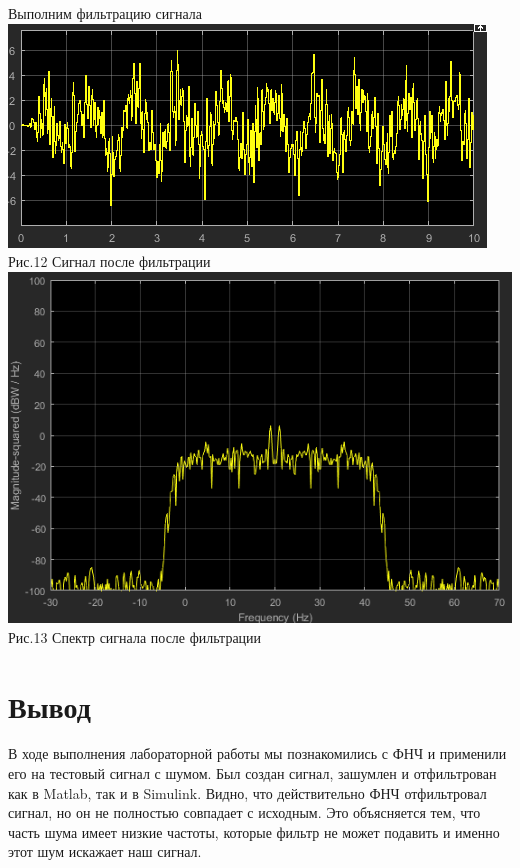 \documentclass[a4paper,12pt]{article}
\begin{document}
Выполним фильтрацию сигнала
\center\includegraphics{pictures/SimulFiltSig.png} \\ Рис.12 Сигнал после фильтрации
\center\includegraphics{pictures/SimulSpecFiltSig.png} \\ Рис.13 Спектр сигнала после фильтрации



\section{Вывод}
В ходе выполнения лабораторной работы мы познакомились с ФНЧ и применили его на тестовый сигнал с шумом. Был создан сигнал, зашумлен и отфильтрован как в Matlab, так и в Simulink. Видно, что действительно ФНЧ отфильтровал сигнал, но он не полностью совпадает с исходным. Это объясняется тем, что часть шума имеет низкие частоты, которые фильтр не может подавить и именно этот шум искажает наш сигнал.
\end{document}
